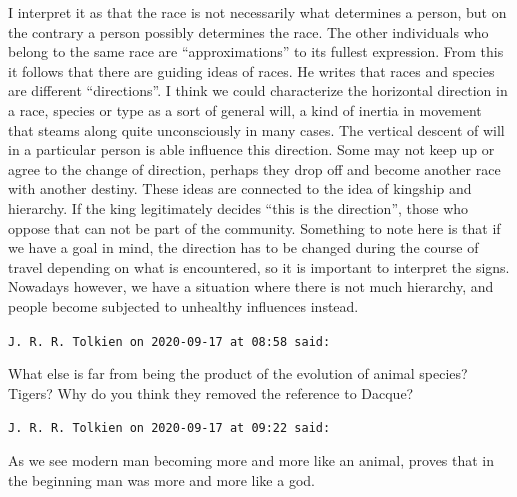 \begin{footnotesize}
\begin{sffamily}
I interpret it as that the race is not necessarily what determines a person, but on the contrary a person possibly determines the race. The other individuals who belong to the same race are ``approximations'' to its fullest expression. From this it follows that there are guiding ideas of races. He writes that races and species are different ``directions''. I think we could characterize the horizontal direction in a race, species or type as a sort of general will, a kind of inertia in movement that steams along quite unconsciously in many cases. The vertical descent of will in a particular person is able influence this direction. Some may not keep up or agree to the change of direction, perhaps they drop off and become another race with another destiny. These ideas are connected to the idea of kingship and hierarchy. If the king legitimately decides ``this is the direction'', those who oppose that can not be part of the community. Something to note here is that if we have a goal in mind, the direction has to be changed during the course of travel depending on what is encountered, so it is important to interpret the signs. Nowadays however, we have a situation where there is not much hierarchy, and people become subjected to unhealthy influences instead.

\hfill

\texttt{J. R. R. Tolkien on 2020-09-17 at 08:58 said:}

What else is far from being the product of the evolution of animal species? Tigers? Why do you think they removed the reference to Dacque?

\hfill

\texttt{J. R. R. Tolkien on 2020-09-17 at 09:22 said:}

As we see modern man becoming more and more like an animal, proves that in the beginning man was more and more like a god.

\hfill

\end{sffamily}
\end{footnotesize}

